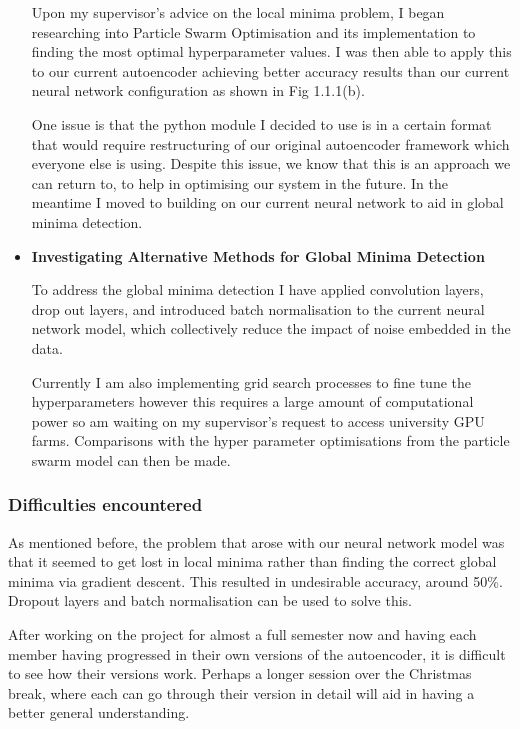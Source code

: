 \begin{itemize}
    Upon my supervisor's advice on the local minima problem, I began researching into Particle Swarm Optimisation \autocite{10.1145/3071178.3071208} and its implementation to finding the most optimal hyperparameter values. I was then able to apply this to our current autoencoder achieving better accuracy results than our current neural network configuration as shown in Fig 1.1.1(b). 
    
    One issue is that the python module I decided to use is in a certain format that would require restructuring of our original autoencoder framework which everyone else is using. Despite this issue, we know that this is an approach we can return to, to help in optimising our system in the future. In the meantime I moved to building on our current neural network to aid in global minima detection.
    
    \item \textbf{Investigating Alternative Methods for Global Minima Detection}
    
    To address the global minima detection I have applied convolution layers, drop out layers, and introduced batch normalisation to the current neural network model, which collectively reduce the impact of noise embedded in the data. 
    
    Currently I am also implementing grid search processes to fine tune the hyperparameters however this requires a large amount of computational power so am waiting on my supervisor's request to access university GPU farms. Comparisons with the hyper parameter optimisations from the particle swarm model can then be made. 
\end{itemize}

\subsubsection{Difficulties encountered}

As mentioned before, the problem that arose with our neural network model was that it seemed to get lost in local minima rather than finding the correct global minima via gradient descent. This resulted in undesirable accuracy, around 50\%. Dropout layers and batch normalisation can be used to solve this.

After working on the project for almost a full semester now and having each member having progressed in their own versions of the autoencoder, it is difficult to see how their versions work. Perhaps a longer session over the Christmas break, where each can go through their version in detail will aid in having a better general understanding.
